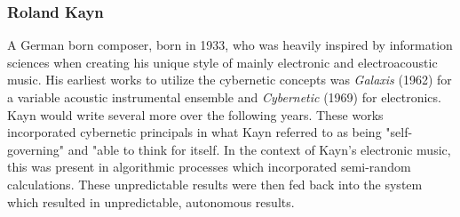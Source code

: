 \subsubsection{Roland Kayn} %

A German born composer, born in 1933, who was heavily inspired by information sciences when creating his unique style of mainly electronic and electroacoustic music\cite{rolandKaynBio}. His earliest works to utilize the cybernetic concepts was \textit{Galaxis} (1962) for a variable acoustic instrumental ensemble and \textit{Cybernetic} (1969) for electronics. Kayn would write several more over the following years. These works incorporated cybernetic principals in what Kayn referred to as being "self-governing"\cite{rolandKaynBio} and "able to think for itself\cite{Kayn_Elektroakustische_Projekte}. In the context of Kayn's electronic music, this was present in algorithmic processes which incorporated semi-random calculations. These unpredictable results were then fed back into the system which resulted in unpredictable, autonomous results\cite{rolandKaynBio}.

